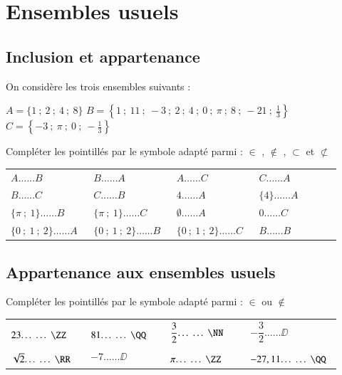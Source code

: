 \documentclass[oneside,12pt]{article}          %
\begin{document}
\section{Ensembles usuels}

\subsection{Inclusion et appartenance}
On considère les trois ensembles suivants :

$A=\{1 ~;~ 2 ~;~ 4 ~;~ 8\}$ \qquad $B=\left\{1 ~;~ 11 ~;~ -3 ~;~ 2 ~;~ 4 ~;~ 0 ~;~ \pi ~;~ 8 ~;~ -21 ~;~ \frac{1}{3}\right\}$ \qquad $C=\left\{-3 ~;~ \pi ~;~ 0 ~;~ -\frac{1}{3}\right\}$

Compléter les pointillés par le symbole adapté parmi : $\in$ , $\notin$ , $\subset$ et $\not\subset$

\renewcommand{\arraystretch}{1.75}
\begin{tabular}{P{0.23\linewidth} P{0.23\linewidth} P{0.23\linewidth} P{0.23\linewidth}}
    $A \ldots\ldots B$ & $B \ldots\ldots A$ & $A \ldots\ldots C$ & $C \ldots\ldots A$ \\
    $B \ldots\ldots C$ & $C \ldots\ldots B$ & $4 \ldots\ldots A$ & $\{4\} \ldots\ldots A$ \\
    $\{\pi ~;~ 1\} \ldots\ldots B$ & $\{\pi ~;~ 1\} \ldots\ldots C$ & $\emptyset \ldots\ldots A$ & $0 \ldots\ldots C$ \\
    $\{0 ~;~ 1 ~;~ 2\} \ldots\ldots A$ & $\{0 ~;~ 1 ~;~ 2\} \ldots\ldots B$ & $\{0 ~;~ 1 ~;~ 2\} \ldots\ldots C$ & $B \ldots\ldots B$
\end{tabular}



\subsection{Appartenance aux ensembles usuels}
Compléter les pointillés par le symbole adapté parmi : $\in$ ou $\notin$

\renewcommand{\arraystretch}{1.75}
\begin{tabular}{P{0.23\linewidth} P{0.23\linewidth} P{0.23\linewidth} P{0.23\linewidth}}
	$23 \ldots\ldots \ZZ$ & $81 \ldots\ldots \QQ$ & $\dfrac{3}{2} \ldots\ldots \NN$ & $-\dfrac{3}{2} \ldots\ldots \DD$ \\
	$\sqrt{2} \ldots\ldots \RR$ & $-7 \ldots\ldots \DD$ & $\pi \ldots\ldots \ZZ$ & $-27,11 \ldots\ldots \QQ$
\end{tabular}
\end{document}
